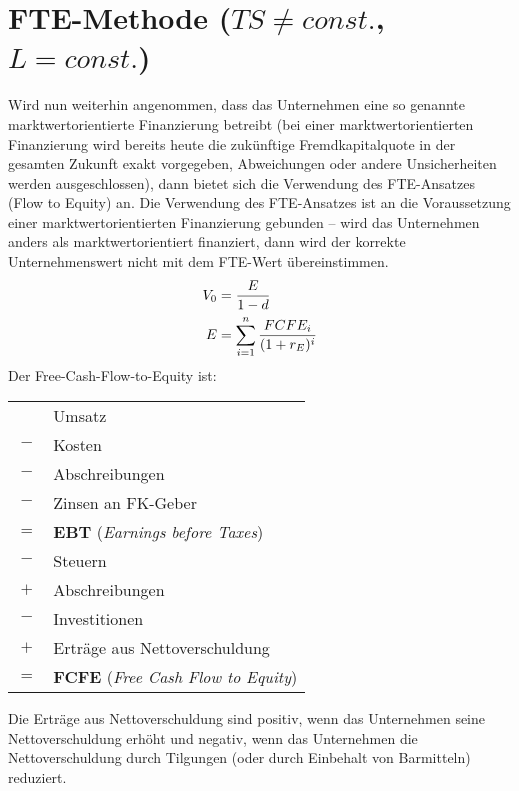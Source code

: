 \documentclass{article}
\begin{document}
	\section*{FTE-Methode ($TS\neq const.$, $L=const.$)}
	Wird nun weiterhin angenommen, dass das Unternehmen eine so genannte marktwertorientierte Finanzierung betreibt (bei einer marktwertorientierten Finanzierung wird bereits heute die zukünftige Fremdkapitalquote in der gesamten Zukunft exakt vorgegeben, Abweichungen oder andere Unsicherheiten werden ausgeschlossen), dann bietet sich die Verwendung des FTE-Ansatzes (Flow to Equity) an. Die Verwendung des FTE-Ansatzes ist an die Voraussetzung einer marktwertorientierten Finanzierung gebunden – wird das Unternehmen anders als marktwertorientiert finanziert, dann wird der korrekte Unternehmenswert nicht mit dem FTE-Wert übereinstimmen.
	\begin{align}
		V_0 &= \frac{E}{1-d} \notag \\
		E &= \sum_{i=1}^n \frac{FCFE_i}{(1+r_E)^i} \notag
	\end{align}
	Der Free-Cash-Flow-to-Equity ist:
	\begin{center}
		\begin{tabular}{cl}
			& Umsatz \\
			$-$ & Kosten \\
			$-$ & Abschreibungen \\
			$-$ & Zinsen an FK-Geber \\
			\hline
			$=$ & \textbf{EBT} (\textit{Earnings before Taxes}) \\
			$-$ & Steuern \\
			$+$ & Abschreibungen \\
			$-$ & Investitionen \\
			$+$ & Erträge aus Nettoverschuldung \\
			\hline
			$=$ & \textbf{FCFE} (\textit{Free Cash Flow to Equity})
		\end{tabular}
	\end{center}
	Die Erträge aus Nettoverschuldung sind positiv, wenn das Unternehmen seine Nettoverschuldung erhöht und negativ, wenn das Unternehmen die Nettoverschuldung durch Tilgungen (oder durch Einbehalt von Barmitteln) reduziert.
\end{document}

